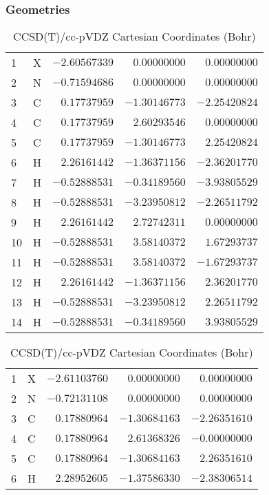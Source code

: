 \documentclass[10pt,oneside]{article}
\begin{document}
\begin{table}[h!]
\subsubsection*{Geometries}
\begin{multicols}{2}
\centering
\caption{CCSD(T)/cc-pVTZ Cartesian Coordinates (Bohr)}
\begin{tabular}{llrrr}
\toprule
1  & X  & $-2.60567339$ & $ 0.00000000$ & $ 0.00000000$ \\
2  & N  & $-0.71594686$ & $ 0.00000000$ & $ 0.00000000$ \\
3  & C  & $ 0.17737959$ & $-1.30146773$ & $-2.25420824$ \\
4  & C  & $ 0.17737959$ & $ 2.60293546$ & $ 0.00000000$ \\
5  & C  & $ 0.17737959$ & $-1.30146773$ & $ 2.25420824$ \\
6  & H  & $ 2.26161442$ & $-1.36371156$ & $-2.36201770$ \\
7  & H  & $-0.52888531$ & $-0.34189560$ & $-3.93805529$ \\
8  & H  & $-0.52888531$ & $-3.23950812$ & $-2.26511792$ \\
9  & H  & $ 2.26161442$ & $ 2.72742311$ & $ 0.00000000$ \\
10 & H  & $-0.52888531$ & $ 3.58140372$ & $ 1.67293737$ \\
11 & H  & $-0.52888531$ & $ 3.58140372$ & $-1.67293737$ \\
12 & H  & $ 2.26161442$ & $-1.36371156$ & $ 2.36201770$ \\
13 & H  & $-0.52888531$ & $-3.23950812$ & $ 2.26511792$ \\
14 & H  & $-0.52888531$ & $-0.34189560$ & $ 3.93805529$ \\
\bottomrule
\end{tabular}
\caption{CCSD(T)/cc-pVDZ Cartesian Coordinates (Bohr)}
\begin{tabular}{llrrr}
\toprule
1  & X  & $-2.61103760$ & $ 0.00000000$ & $ 0.00000000$ \\
2  & N  & $-0.72131108$ & $ 0.00000000$ & $ 0.00000000$ \\
3  & C  & $ 0.17880964$ & $-1.30684163$ & $-2.26351610$ \\
4  & C  & $ 0.17880964$ & $ 2.61368326$ & $-0.00000000$ \\
5  & C  & $ 0.17880964$ & $-1.30684163$ & $ 2.26351610$ \\
6  & H  & $ 2.28952605$ & $-1.37586330$ & $-2.38306514$ \\

\end{tabular}
\end{multicols}
\end{table}
\end{document}
